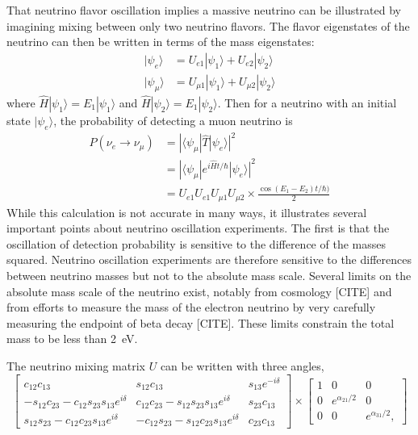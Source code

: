 That neutrino flavor oscillation implies a massive neutrino can be illustrated by imagining mixing between only two neutrino flavors. The flavor eigenstates of the neutrino can then be written in terms of the mass eigenstates: 
\begin{align}
|\psi_e\rangle &= U_{e1}|\psi_1\rangle + U_{e2}|\psi_2\rangle \\
|\psi_{\mu}\rangle &= U_{{\mu}1}|\psi_1\rangle + U_{{\mu}2}|\psi_2\rangle 
\end{align}
where $\hat{H}|\psi_1\rangle = E_1|\psi_1\rangle$ and $\hat{H}|\psi_2\rangle = E_1|\psi_2\rangle$.  Then for a neutrino with an initial state $|\psi_e\rangle$, the probability of detecting a muon neutrino is
\begin{align}
P(\nu_e\rightarrow\nu_{\mu}) &=  |\langle\psi_{\mu}|\hat{T}|\psi_e\rangle|^2 \\
                             &=  |\langle\psi_{\mu}|e^{i\hat{H}t / \hbar}|\psi_e\rangle|^2 \\
                             &=  U_{e1}U_{e1}U_{{\mu}1}U_{{\mu}2} \times \frac{\cos(E_1 - E_2)t/\hbar)}{2} 
\end{align}
While this calculation is not accurate in many ways, it illustrates several important points about neutrino oscillation experiments.  The first is that the oscillation of detection probability is sensitive to the difference of the masses squared.  Neutrino oscillation experiments are therefore sensitive to the differences between neutrino masses but not to the absolute mass scale.  Several limits on the absolute mass scale of the neutrino exist, notably from cosmology [CITE] and from efforts to measure the mass of the electron neutrino by very carefully measuring the endpoint of beta decay [CITE].  These limits constrain the total mass to be less than 2~eV.  

The neutrino mixing matrix $U$ can be written with three angles,
\begin{equation}
\begin{bmatrix}
c_{12}c_{13} & s_{12}c_{13} & s_{13}e^{-i\delta} \\
-s_{12}c_{23}-c_{12}s_{23}s_{13}e^{i\delta} & c_{12}c_{23}-s_{12}s_{23}s_{13}e^{i\delta} & s_{23}c_{13} \\
s_{12}s_{23}-c_{12}c_{23}s_{13}e^{i\delta} & -c_{12}s_{23}-s_{12}c_{23}s_{13}e^{i\delta} & c_{23}c_{13} 
\end{bmatrix}
\times
\begin{bmatrix}
1 & 0 & 0 \\
0 & e^{\alpha_{21} / 2} & 0 \\
0 & 0 & e^{\alpha_{31} / 2},
\end{bmatrix}
\end{equation}

